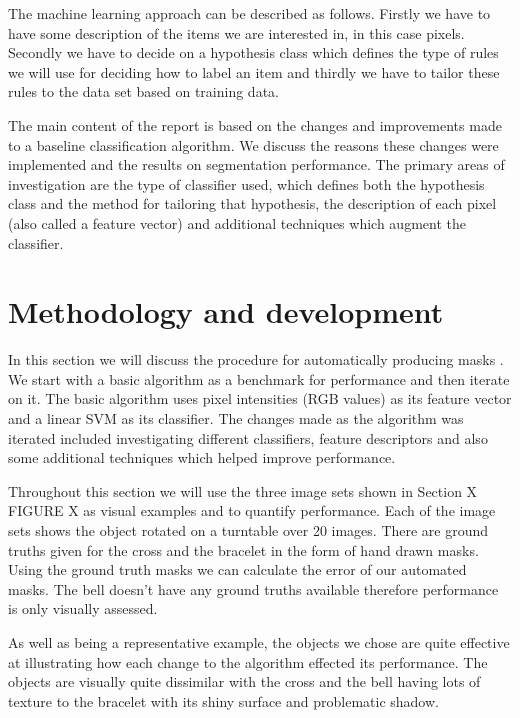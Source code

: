 \documentclass[12pt]{IIBproject}
\begin{document}
The machine learning approach can be described as follows. Firstly we have to have some description of the items we are interested in, in this case pixels. Secondly we have to decide on a hypothesis class which defines the type of rules we will use for deciding how to label an item and thirdly we have to tailor these rules to the data set based on training data. 

The main content of the report is based on the changes and improvements made to a baseline classification algorithm. We discuss the reasons these changes were implemented and the results on segmentation performance. The primary areas of investigation are the type of classifier used, which defines both the hypothesis class and the method for tailoring that hypothesis, the description of each pixel (also called a feature vector) and additional techniques which augment the classifier. 

\section{Methodology and development}

 In this section we will discuss the procedure for automatically producing masks . We start with a basic algorithm as a benchmark for performance and then iterate on it. The basic algorithm uses pixel intensities (RGB values) as its feature vector and a linear SVM as its classifier. The changes made as the algorithm was iterated included investigating different classifiers, feature descriptors and also some additional techniques which helped improve performance. 
 
 Throughout this section we will use the three image sets shown in Section X FIGURE X as visual examples and to quantify performance.  Each of the image sets shows the object rotated on a turntable over 20 images. There are ground truths given for the cross and the bracelet in the form of hand drawn masks. Using the ground truth masks we can calculate the error of our automated masks. The bell doesn't have any ground truths available therefore performance is only visually assessed. 

As well as being a representative example, the objects we chose are quite effective at illustrating how each change to the algorithm effected its performance. The objects are visually quite dissimilar with the cross and the bell having lots of texture to the bracelet with its shiny surface and problematic shadow. 
\end{document}
